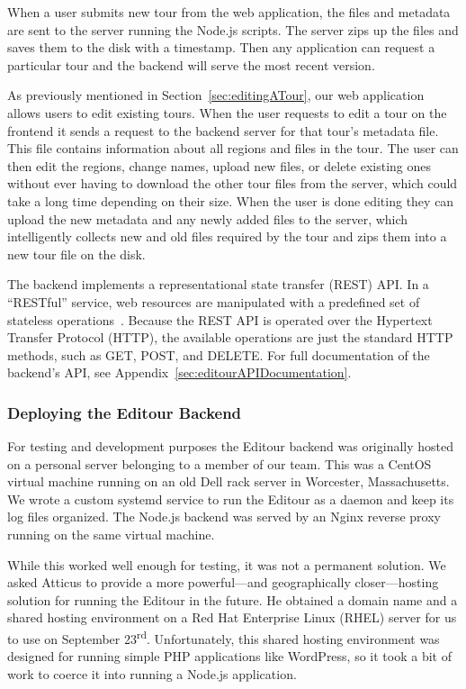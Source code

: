 \documentclass[a4paper, 10pt, american, titlepage]{article}
\begin{document}
When a user submits new tour from the web application, the files and metadata
are sent to the server running the Node.js scripts. The server zips up the files
and saves them to the disk with a timestamp. Then any application can request a
particular tour and the backend will serve the most recent version.

As previously mentioned in Section~\ref{sec:editingATour}, our web application
allows users to edit existing tours. When the user requests to edit a tour on
the frontend it sends a request to the backend server for that tour's metadata
file. This file contains information about all regions and files in the tour.
The user can then edit the regions, change names, upload new files, or delete
existing ones without ever having to download the other tour files from the
server, which could take a long time depending on their size. When the user is
done editing they can upload the new metadata and any newly added files to the
server, which intelligently collects new and old files required by the tour and
zips them into a new tour file on the disk.

The backend implements a representational state transfer (REST) API.
In a ``RESTful'' service, web resources are manipulated with a predefined set of
stateless operations~\autocite{rfc7231}. Because the REST API is operated over
the Hypertext Transfer Protocol (HTTP), the available operations are just the
standard HTTP methods, such as GET, POST, and DELETE. For full documentation of
the backend's API, see Appendix~\ref{sec:editourAPIDocumentation}.

\subsubsection{Deploying the Editour Backend}
\label{sec:deployingTheEditourBackend}

For testing and development purposes the Editour backend was originally hosted
on a personal server belonging to a member of our team. This was a CentOS
virtual machine running on an old Dell rack server in Worcester, Massachusetts.
We wrote a custom systemd service to run the Editour as a daemon and keep its
log files organized. The Node.js backend was served by an Nginx reverse proxy
running on the same virtual machine.

While this worked well enough for testing, it was not a permanent solution. We
asked Atticus to provide a more powerful---and geographically closer---hosting
solution for running the Editour in the future. He obtained a domain name and a
shared hosting environment on a Red Hat Enterprise Linux (RHEL) server for us to
use on September 23\textsuperscript{rd}. Unfortunately, this shared hosting
environment was designed for running simple PHP applications like WordPress, so
it took a bit of work to coerce it into running a Node.js application.
\end{document}
